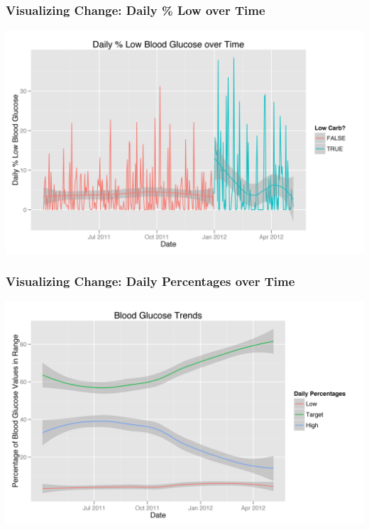 \documentclass{beamer}
\begin{document}
\begin{frame}
  \frametitle{Visualizing Change: Daily \% Low over Time}
  
  \begin{center}
    \includegraphics[width=\textwidth]{daily_low.jpg}
  \end{center}

\end{frame}

\begin{frame}
  \frametitle{Visualizing Change: Daily Percentages over Time}
  
  \begin{center}
    \includegraphics[width=\textwidth]{percentages.jpg}
  \end{center}

\end{frame}
\end{document}
